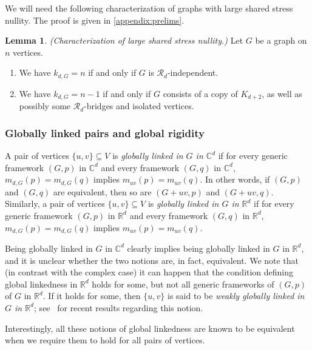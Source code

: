 \documentclass[11pt,a4paper,dvipsnames]{scrartcl}
\theoremstyle{definition}
\newtheorem{lemma}[theorem]{Lemma}
\newcommand{\RR}{\mathbb{R}}
\newcommand{\CC}{\mathbb{C}}
\newcommand{\stressnullity}[1]{k_{d, #1}}
\begin{document}
We will need the following characterization of graphs with large shared stress nullity. The proof is given in \cref{appendix:prelims}.

\begin{lemma}\label{lemma:largenullity} \emph{(Characterization of large shared stress nullity.)}\newline
    Let $G$ be a graph on $n$ vertices.
    \begin{enumerate}
        \item We have $\stressnullity{G} = n$ if and only if $G$ is $\mathcal{R}_d$-independent.
        \item We have $\stressnullity{G} = n-1$ if and only if $G$ consists of a copy of $K_{d+2}$, as well as possibly some $\mathcal{R}_d$-bridges and isolated vertices.
    \end{enumerate}
\end{lemma}




\subsubsection{Globally linked pairs and global rigidity}
A pair of vertices $\{u,v\} \subseteq V$ is \emph{globally linked in $G$ in $\CC^d$} if for every generic framework $(G,p)$ in $\CC^d$ and every framework $(G,q)$ in $\CC^d$, $m_{d,G}(p) = m_{d,G}(q)$ implies $m_{uv}(p) = m_{uv}(q)$. In other words, if $(G,p)$ and $(G,q)$ are equivalent, then so are $(G+uv,p)$ and $(G+uv,q)$.
Similarly, a pair of vertices $\{u,v\} \subseteq V$ is \emph{globally linked in $G$ in $\RR^d$} if for every generic framework $(G,p)$ in $\RR^d$ and every framework $(G,q)$ in $\RR^d$, $m_{d,G}(p) = m_{d,G}(q)$ implies $m_{uv}(p) = m_{uv}(q)$. 

Being globally linked in $G$ in $\CC^d$ clearly implies being globally linked in $G$ in $\RR^d$, and it is unclear whether the two notions are, in fact, equivalent. %
We note that (in contrast with the complex case) it can happen that the condition defining global linkedness in $\RR^d$ holds for some, but not all generic frameworks of $(G,p)$ of $G$ in $\RR^d$. If it holds for some, then $\{u,v\}$ is said to be \emph{weakly globally linked in $G$ in $\RR^d$}; see~\cite{jordan.villanyi_2023} for recent results regarding this notion. 

Interestingly, all these notions of global linkedness are known to be equivalent when we require them to hold for all pairs of vertices.
\end{document}
